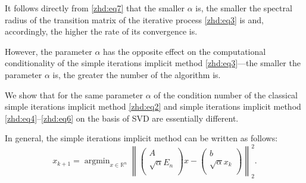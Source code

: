 It follows directly from \eqref{zhd:eq7} that the smaller $\alpha$ is, the smaller the spectral radius of the transition matrix of the iterative process \eqref{zhd:eq3}  is and, accordingly, the higher the rate of its convergence is.

However, the parameter $\alpha$ has the opposite effect on the computational conditionality of the simple iterations implicit method \eqref{zhd:eq3}---the smaller the parameter $\alpha$ is, the greater the number of the algorithm is.

We show that for the same parameter $\alpha$ of the condition number of the classical simple iterations implicit method \eqref{zhd:eq2} and simple iterations implicit method \eqref{zhd:eq4}--\eqref{zhd:eq6} on the basis of SVD are essentially different.

In general, the simple iterations implicit method can be written as follows:
\begin{equation}
x_{k+1}=\mathop{\mathrm{argmin}}_{x\in\mathbb{R}^{n}}\left\|\left(
                                                 \begin{array}{c}
                                                   A \\
                                                   \sqrt{\alpha}E_n  \\
                                                 \end{array}
                                               \right)x-\left(
                                                          \begin{array}{c}
                                                            b \\
                                                            \sqrt{\alpha}x_k \\
                                                          \end{array}
                                                        \right)
                                               \right\|_2^2. 
\label{zhd:eq8}
\end{equation}

